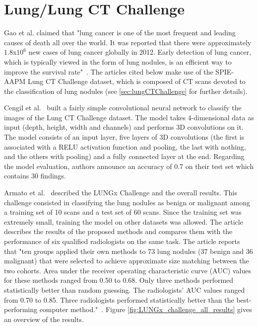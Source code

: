 \section{Lung/Lung CT Challenge}

\setlength{\marginparwidth}{3cm}\leavevmode {}Gao et al. claimed that "lung cancer is one of the most frequent and leading causes of death all over the world. It was reported that there were approximately $1.8$x$10^6$ new cases of lung cancer globally in 2012. Early detection of lung cancer, which is typically viewed in the form of lung nodules, is an efficient way to improve the survival rate"~\cite{41}. The articles cited below make use of the SPIE-AAPM Lung CT Challenge dataset, which is composed of CT scans devoted to the classification of lung nodules (see \ref{sec:lungCTChallenge} for further details).

Cengil et al.~\cite{02} built a fairly simple convolutional neural network to classify the images of the Lung CT Challenge dataset. The model takes 4-dimensional data as input (depth, height, width and channels) and performs 3D convolutions on it. The model consists of an input layer, five layers of 3D convolutions (the first is associated with a RELU activation function and pooling, the last with nothing, and the others with pooling) and a fully connected layer at the end. Regarding the model evaluation, authors announce an accuracy of 0.7 on their test set which contains 30 findings.

Armato et al.~\cite{12} described the LUNGx Challenge and the overall results. This challenge consisted in classifying the lung nodules as benign or malignant among a training set of 10 scans and a test set of 60 scans. Since the training set was extremely small, training the model on other datasets was allowed. The article describes the results of the proposed methods and compares them with the performance of six qualified radiologists on the same task. The article reports that "ten groups applied their own methods to 73 lung nodules (37 benign and 36 malignant) that were selected to achieve approximate size matching between the two cohorts. Area under the receiver operating characteristic curve (AUC) values for these methods ranged from 0.50 to 0.68. Only three methods performed statistically better than random guessing. The radiologists’ AUC values ranged from 0.70 to 0.85. Three radiologists performed statistically better than the best-performing computer method."~\cite{12}. Figure \ref{fig:LUNGx_challenge_all_results} gives an overview of the results.

